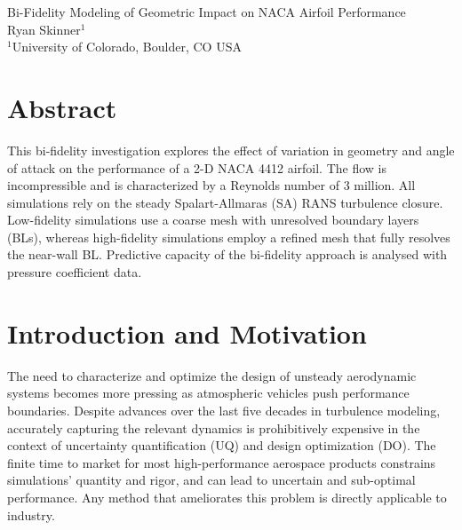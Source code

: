 \documentclass[11pt]{article}
\begin{document}
{
	\fancyhf[LH]{}
	\fancyhf[CH]{}
	\fancyhf[RH]{\thepage}
	\fancyhf[LF]{}
	\fancyhf[CF]{}
	\fancyhf[RF]{}
}

{
	\fancyhf[CH]{}
	\fancyhf[LF]{}
	\fancyhf[CF]{}
	\fancyhf[RF]{}
}

\pagestyle{allpages}
\thispagestyle{firstpage}
\renewcommand{\sectionmark}[1]{ \markright{#1}{} }

\vspace*{0in}
\begin{center}
\Large
Bi-Fidelity Modeling of Geometric Impact on NACA Airfoil Performance
\\[1ex]
\large
Ryan Skinner$^1$
\\[1ex]
\normalsize
$^1$University of Colorado, Boulder, CO USA
\end{center}
\vspace*{0.3in}

\section*{Abstract}
This bi-fidelity investigation explores the effect of variation in geometry and angle of attack on the performance of a 2-D NACA 4412 airfoil. The flow is incompressible and is characterized by a Reynolds number of 3 million. All simulations rely on the steady Spalart-Allmaras (SA) RANS turbulence closure. Low-fidelity simulations use a coarse mesh with unresolved boundary layers (BLs), whereas high-fidelity simulations employ a refined mesh that fully resolves the near-wall BL. Predictive capacity of the bi-fidelity approach is analysed with pressure coefficient data.

\section{Introduction and Motivation}

The need to characterize and optimize the design of unsteady aerodynamic systems becomes more pressing as atmospheric vehicles push performance boundaries. Despite advances over the last five decades in turbulence modeling, accurately capturing the relevant dynamics is prohibitively expensive in the context of uncertainty quantification (UQ) and design optimization (DO). The finite time to market for most high-performance aerospace products constrains simulations' quantity and rigor, and can lead to uncertain and sub-optimal performance. Any method that ameliorates this problem is directly applicable to industry.
\end{document}
